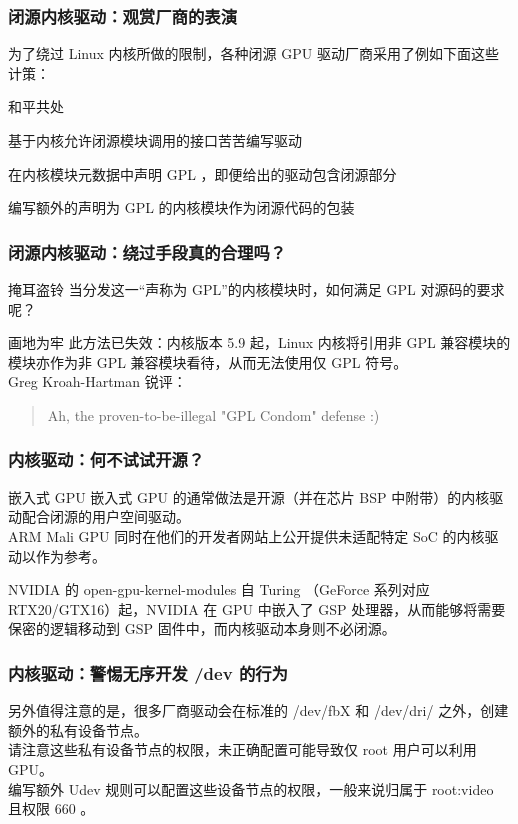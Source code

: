 \documentclass{ctexbeamer}
\begin{document}
\begin{frame}
    \frametitle{闭源内核驱动：观赏厂商的表演}
    为了绕过 Linux 内核所做的限制，各种闭源 GPU 驱动厂商采用了例如下面这些计策：\\
    \begin{labeling}{和平共处}
        \item [和平共处] 基于内核允许闭源模块调用的接口苦苦编写驱动
        \item [掩耳盗铃] 在内核模块元数据中声明 GPL ，即便给出的驱动包含闭源部分
        \item [画地为牢] 编写额外的声明为 GPL 的内核模块作为闭源代码的包装
    \end{labeling}
\end{frame}

\begin{frame}
    \frametitle{闭源内核驱动：绕过手段真的合理吗？}
    \begin{block}{掩耳盗铃}
        当分发这一“声称为 GPL”的内核模块时，如何满足 GPL 对源码的要求呢？
    \end{block}
    \begin{block}{画地为牢}
        此方法已失效：内核版本 5.9 起，Linux 内核将引用非 GPL 兼容模块的模块亦作为非 GPL 兼容模块看待，从而无法使用仅 GPL 符号。\\
        Greg Kroah-Hartman 锐评：
        \begin{quote}
            Ah, the proven-to-be-illegal "GPL Condom" defense :)
        \end{quote}
    \end{block}
\end{frame}

\begin{frame}
    \frametitle{内核驱动：何不试试开源？}
    \begin{block}{嵌入式 GPU}
        嵌入式 GPU 的通常做法是开源（并在芯片 BSP 中附带）的内核驱动配合闭源的用户空间驱动。\\
        ARM Mali GPU 同时在他们的开发者网站上公开提供未适配特定 SoC 的内核驱动以作为参考。
    \end{block}
    \begin{block}{NVIDIA 的 open-gpu-kernel-modules}
        自 Turing （GeForce 系列对应 RTX20/GTX16）起，NVIDIA 在 GPU 中嵌入了 GSP 处理器，从而能够将需要保密的逻辑移动到 GSP 固件中，而内核驱动本身则不必闭源。
    \end{block}
\end{frame}

\begin{frame}
    \frametitle{内核驱动：警惕无序开发 /dev 的行为}
    另外值得注意的是，很多厂商驱动会在标准的 /dev/fbX 和 /dev/dri/ 之外，创建额外的私有设备节点。\\
    请注意这些私有设备节点的权限，未正确配置可能导致仅 root 用户可以利用 GPU。\\
    编写额外 Udev 规则可以配置这些设备节点的权限，一般来说归属于 root:video 且权限 660 。
\end{frame}
\end{document}
